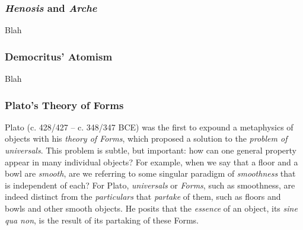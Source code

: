 \subsubsection{\textit{Henosis} and \textit{Arche}}

Blah


\subsubsection{Democritus' Atomism}

Blah


\subsubsection{Plato's Theory of Forms}


Plato (c. 428/427 -- c. 348/347 BCE) was the first to expound a metaphysics of objects with his \textit{theory of Forms}, which proposed a solution to the \textit{problem of universals}. This problem is subtle, but important: how can one general property appear in many individual objects? For example, when we say that a floor and a bowl are \textit{smooth}, are we referring to some singular paradigm of \textit{smoothness} that is independent of each? For Plato, \textit{universals} or \textit{Forms}, such as smoothness, are indeed distinct from the \textit{particulars} that \textit{partake} of them, such as floors and bowls and other smooth objects. He posits that the \textit{essence} of an object, its \textit{sine qua non}, is the result of its partaking of these Forms. \\

